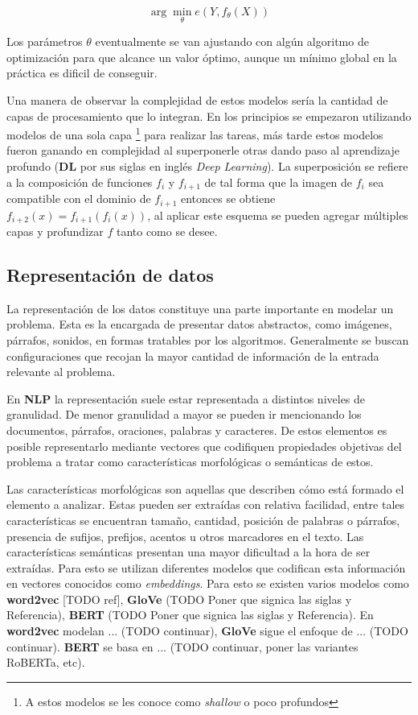\begin{equation}
	\arg \min_{\theta} e(Y, f_{\theta}(X))
\end{equation}\label{eq:arg_min_theta}

Los parámetros $\theta$ eventualmente se van ajustando con algún algoritmo de optimización para que alcance 
un valor óptimo, aunque un mínimo global en la práctica es dificil de conseguir.

Una manera de observar la complejidad de estos modelos sería la cantidad de capas de procesamiento que lo integran.
En los principios se empezaron utilizando modelos de una sola capa \footnote{A estos modelos se les conoce 
como \emph{shallow} o poco profundos} para realizar 
las tareas, más tarde estos modelos fueron ganando en complejidad al superponerle otras dando paso al 
aprendizaje profundo (\textbf{DL} por sus siglas en inglés \emph{Deep Learning}). La superposición se refiere
a la composición de funciones $f_i$ y $f_{i+1}$ de tal forma que la imagen de $f_i$ sea compatible con el dominio de 
$f_{i+1}$ entonces se obtiene $f_{i+2}(x) = f_{i+1}(f_i(x))$, al aplicar este esquema se pueden agregar múltiples
capas y profundizar $f$ tanto como se desee.


\subsection{Representación de datos}

La representación de los datos constituye una parte importante en modelar un problema. Esta 
es la encargada de presentar datos abstractos, como imágenes, párrafos, sonidos, en formas tratables
por los algoritmos. Generalmente se buscan configuraciones que recojan la mayor cantidad de información 
de la entrada relevante al problema.

En \textbf{NLP} la representación suele estar representada a distintos niveles de granulidad.
De menor granulidad a mayor se pueden ir mencionando los documentos, párrafos, oraciones, palabras y
caracteres. De estos elementos es posible representarlo mediante vectores que codifiquen propiedades
objetivas del problema a tratar como características morfológicas o semánticas de estos.

Las características morfológicas son aquellas que describen cómo está formado el elemento a analizar.
Estas pueden ser extraídas con relativa facilidad, entre tales características se encuentran tamaño, 
cantidad, posición de palabras o párrafos, presencia de sufijos, prefijos, acentos u otros marcadores
en el texto. Las características semánticas presentan una mayor dificultad a la hora de ser extraídas.
Para esto se utilizan diferentes modelos que codifican esta información en vectores conocidos como 
\emph{embeddings}. Para esto se existen varios modelos 
como \textbf{word2vec} [TODO ref], \textbf{GloVe} (TODO Poner que signica las siglas y Referencia), \textbf{BERT}
(TODO Poner que signica las siglas y Referencia).
En \textbf{word2vec} modelan ... (TODO continuar), \textbf{GloVe}
sigue el enfoque de ... (TODO continuar). \textbf{BERT} se basa en ... (TODO continuar, poner las variantes RoBERTa, etc).


